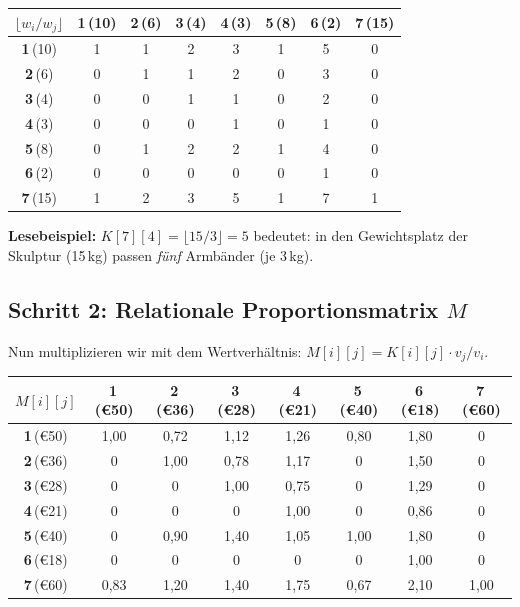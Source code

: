 \documentclass[a4paper,11pt]{article}
\begin{document}
\begin{center}
\small
\renewcommand{\arraystretch}{1.15}
\begin{tabular}{c|ccccccc}
\toprule
$\lfloor w_i/w_j \rfloor$ &
\textbf{1}\,(10) & \textbf{2}\,(6) & \textbf{3}\,(4) &
\textbf{4}\,(3) & \textbf{5}\,(8) & \textbf{6}\,(2) & \textbf{7}\,(15) \\
\midrule
\textbf{1}\,(10) & 1 & 1 & 2 & 3 & 1 & 5 & 0 \\
\textbf{2}\,(6)  & 0 & 1 & 1 & 2 & 0 & 3 & 0 \\
\textbf{3}\,(4)  & 0 & 0 & 1 & 1 & 0 & 2 & 0 \\
\textbf{4}\,(3)  & 0 & 0 & 0 & 1 & 0 & 1 & 0 \\
\textbf{5}\,(8)  & 0 & 1 & 2 & 2 & 1 & 4 & 0 \\
\textbf{6}\,(2)  & 0 & 0 & 0 & 0 & 0 & 1 & 0 \\
\textbf{7}\,(15) & 1 & 2 & 3 & 5 & 1 & 7 & 1 \\
\bottomrule
\end{tabular}
\end{center}

\noindent
\textbf{Lesebeispiel:}
$K[7][4] = \lfloor 15/3 \rfloor = 5$ bedeutet:
in den Gewichtsplatz der Skulptur (15\,kg) passen
\emph{fünf} Armbänder (je 3\,kg).

\subsection{Schritt 2: Relationale Proportionsmatrix $M$}

Nun multiplizieren wir mit dem Wertverhältnis:
$M[i][j] = K[i][j] \cdot v_j/v_i$.

\begin{center}
\small
\renewcommand{\arraystretch}{1.15}
\begin{tabular}{c|ccccccc}
\toprule
$M[i][j]$ &
\textbf{1}\,(\euro50) & \textbf{2}\,(\euro36) & \textbf{3}\,(\euro28) &
\textbf{4}\,(\euro21) & \textbf{5}\,(\euro40) & \textbf{6}\,(\euro18) &
\textbf{7}\,(\euro60) \\
\midrule
\textbf{1}\,(\euro50) & 1{,}00 & 0{,}72 & 1{,}12 & 1{,}26 & 0{,}80 & 1{,}80 & 0 \\
\textbf{2}\,(\euro36) & 0 & 1{,}00 & 0{,}78 & 1{,}17 & 0 & 1{,}50 & 0 \\
\textbf{3}\,(\euro28) & 0 & 0 & 1{,}00 & 0{,}75 & 0 & 1{,}29 & 0 \\
\textbf{4}\,(\euro21) & 0 & 0 & 0 & 1{,}00 & 0 & 0{,}86 & 0 \\
\textbf{5}\,(\euro40) & 0 & 0{,}90 & 1{,}40 & 1{,}05 & 1{,}00 & 1{,}80 & 0 \\
\textbf{6}\,(\euro18) & 0 & 0 & 0 & 0 & 0 & 1{,}00 & 0 \\
\textbf{7}\,(\euro60) & 0{,}83 & 1{,}20 & 1{,}40 & 1{,}75 & 0{,}67 & 2{,}10 & 1{,}00 \\
\bottomrule
\end{tabular}
\end{center}
\end{document}
